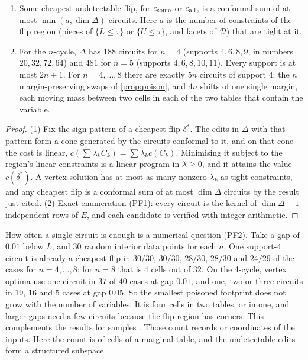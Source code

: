 \documentclass[11pt]{article}
\theoremstyle{definition}\newtheorem{definition}[theorem]{Definition}\newtheorem{remark}[theorem]{Remark}\newtheorem{example}[theorem]{Example}\newtheorem{problem}[theorem]{Open problem}\crefname{problem}{Problem}{Problems}
\begin{document}
\begin{proposition}\label{prop:sparse}
\begin{enumerate}
\item[(1)] Some cheapest undetectable flip, for $c_{\rm some}$ or $c_{\rm all}$, is a conformal sum of at most $\min(a,\dim\Delta)$ circuits. Here $a$ is the number of constraints of the flip region (pieces of $\{L\le\tau\}$ or $\{U\le\tau\}$, and facets of $\mathcal D$) that are tight at it.
\item[(2)] For the $n$-cycle, $\Delta$ has $188$ circuits for $n=4$ (supports $4,6,8,9$, in numbers $20,32,72,64$) and $481$ for $n=5$ (supports $4,6,8,10,11$). Every support is at most $2n+1$. For $n=4,\dots,8$ there are exactly $5n$ circuits of support $4$: the $n$ margin-preserving swaps of \cref{prop:poison}, and $4n$ shifts of one single margin, each moving mass between two cells in each of the two tables that contain the variable.
\end{enumerate}
\end{proposition}

\begin{proof}
(1) Fix the sign pattern of a cheapest flip $\delta^*$. The edits in $\Delta$ with that pattern form a cone generated by the circuits conformal to it, and on that cone the cost is linear, $c(\sum\lambda_kC_k)=\sum\lambda_k c(C_k)$. Minimising it subject to the region's linear constraints is a linear program in $\lambda\ge0$, and it attains the value $c(\delta^*)$. A vertex solution has at most as many nonzero $\lambda_k$ as tight constraints, and any cheapest flip is a conformal sum of at most $\dim\Delta$ circuits by the result just cited. (2) Exact enumeration (PF1): every circuit is the kernel of $\dim\Delta-1$ independent rows of $E$, and each candidate is verified with integer arithmetic.
\end{proof}

How often a single circuit is enough is a numerical question (PF2). Take a gap of $0.01$ below $L$, and $30$ random interior data points for each $n$. One support-$4$ circuit is already a cheapest flip in $30/30$, $30/30$, $28/30$, $28/30$ and $24/29$ of the cases for $n=4,\dots,8$; for $n=8$ that is $4$ cells out of $32$. On the 4-cycle, vertex optima use one circuit in $37$ of $40$ cases at gap $0.01$, and one, two or three circuits in $19$, $16$ and $5$ cases at gap $0.05$. So the smallest poisoned footprint does not grow with the number of variables. It is four cells in two tables, or in one, and larger gaps need a few circuits because the flip region has corners. This complements the results for samples \cite{BroderickGiordanoMeager2020,SteinhardtKohLiang2017,MahloujifarEtAl2019}. Those count records or coordinates of the inputs. Here the count is of cells of a marginal table, and the undetectable edits form a structured subspace.
\end{document}
